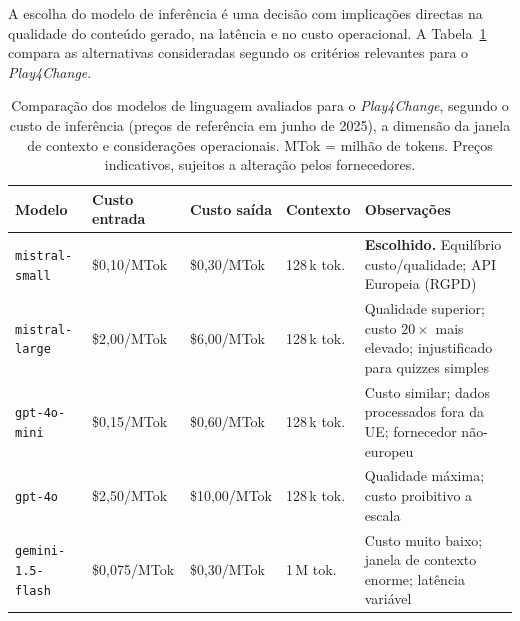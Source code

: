 A escolha do modelo de inferência é uma decisão com implicações directas na qualidade do conteúdo gerado, na latência e no custo operacional. A Tabela~\ref{tab:comparacao-modelos} compara as alternativas consideradas segundo os critérios relevantes para o \emph{Play4Change}.

\begin{table}[h]
    \centering
    \small
    \begin{tabular}{p{3.0cm} p{2.2cm} p{2.2cm} p{1.8cm} p{3.5cm}}
        \toprule
        \textbf{Modelo} &
        \textbf{Custo entrada} &
        \textbf{Custo saída} &
        \textbf{Contexto} &
        \textbf{Observações} \\
        \midrule
        \texttt{mistral-small} &
            \$0,10/MTok &
            \$0,30/MTok &
            128\,k tok. &
            \textbf{Escolhido.} Equilíbrio custo/qualidade; API Europeia (RGPD) \\
        \addlinespace
        \texttt{mistral-large} &
            \$2,00/MTok &
            \$6,00/MTok &
            128\,k tok. &
            Qualidade superior; custo $20\times$ mais elevado; injustificado para quizzes simples \\
        \addlinespace
        \texttt{gpt-4o-mini} &
            \$0,15/MTok &
            \$0,60/MTok &
            128\,k tok. &
            Custo similar; dados processados fora da UE; fornecedor não-europeu \\
        \addlinespace
        \texttt{gpt-4o} &
            \$2,50/MTok &
            \$10,00/MTok &
            128\,k tok. &
            Qualidade máxima; custo proibitivo a escala \\
        \addlinespace
        \texttt{gemini-1.5-flash} &
            \$0,075/MTok &
            \$0,30/MTok &
            1\,M tok. &
            Custo muito baixo; janela de contexto enorme; latência variável \\
        \bottomrule
    \end{tabular}
    \caption[Comparação de modelos de linguagem considerados]{Comparação dos modelos de linguagem avaliados para o \emph{Play4Change}, segundo o custo de inferência (preços de referência em junho de 2025), a dimensão da janela de contexto e considerações operacionais. MTok = milhão de tokens. Preços indicativos, sujeitos a alteração pelos fornecedores.}
    \label{tab:comparacao-modelos}
\end{table}


